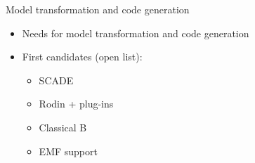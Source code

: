 \begin{frame}{Model transformation and code generation}




\begin{itemize}
\item Needs for model transformation and code generation
\item First candidates (open list):
\begin{itemize}
\item SCADE
\item Rodin + plug-ins
\item Classical B
\item EMF support
\end{itemize}
\end{itemize}



\end{frame}
